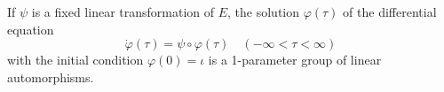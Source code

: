 If $\psi$ is a fixed linear transformation of $E$, the solution $\varphi(\tau)$ of the differential equation
$$\dot{\varphi}(\tau) = \psi \circ \varphi(\tau) \quad (-\infty < \tau < \infty)$$
with the initial condition $\varphi(0) = \iota$ is a 1-parameter group of linear automorphisms.
